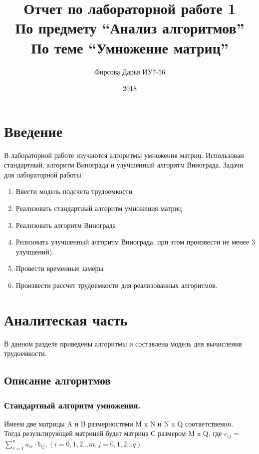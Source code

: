 \documentclass[12pt]{article}
\title{Отчет по лабораторной работе 1 \\ 
	По предмету “Анализ алгоритмов” \\
	По теме “Умножение матриц”
}
\date{2018}
\author{Фирсова Дарья ИУ7-56}
\begin{document}
  
	\maketitle  
	\newpage
	\section*{Введение}
	В лабораторной работе изучаются алгоритмы умножения матриц. Использован стандартный, алгоритм Винограда и улучшенный алгоритм Винограда. Задачи для лабораторной работы:
\begin{enumerate}
	\item Ввести модель подсчета трудоемкости
	\item Реализовать стандартный алгоритм умножения матриц
	\item Реализовать алгоритм Винограда
	\item Релизовать улучшенный алгоритм Винограда, при этом произвести не менее 3 улучшений).
	\item Провести временные замеры
	\item Произвести рассчет трудоемкости для реализованных алгоритмов.
\end{enumerate}
\newpage

\section{Аналитеская часть}
В данном разделе приведены алгоритмы и составлена модель для вычисления трудоемкости.
\subsection{Описание алгоритмов}

\subsubsection{Стандартный алгоритм умножения. }

Имеем две матрицы A и B размерностями M x N и N x Q соответственно. \\Тогда результирующей матрицей будет матрица С размером M x Q, где $c_{ij}$ = $\sum_{r=1}^n a_{ir}\cdot b_{rj} ,   (i = 0,1,2...m, j = 0,1,2...q)$.
\\
\\
\end{document}
